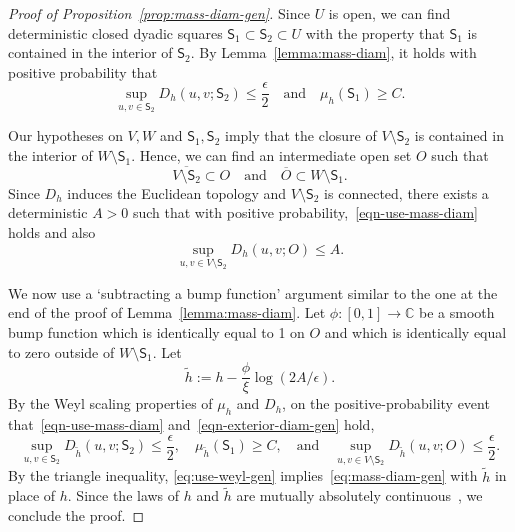 \documentclass[12pt]{amsart}
\numberwithin{equation}{section}
\begin{document}
	
	\begin{proof}[Proof of Proposition~\ref{prop:mass-diam-gen}]
		Since $U$ is open, we can find deterministic closed dyadic squares $\mathsf S_1 \subset \mathsf S_2 \subset U$ with the property that $\mathsf S_1$ is contained in the interior of $\mathsf S_2$. By Lemma~\ref{lemma:mass-diam}, it holds with positive probability that
		\begin{equation} \label{eqn-use-mass-diam}
		\sup_{u,v\in \mathsf S_2 } D_h\left( u , v ; \mathsf S_2 \right) \leq \frac{\epsilon}{2}  \quad \text{and} \quad \mu_h(\mathsf S_1) \geq C .
		\end{equation}
		
		Our hypotheses on $V,W$ and $\mathsf S_1,\mathsf S_2$ imply that the closure of $V\setminus \mathsf S_2$ is contained in the interior of $W\setminus \mathsf S_1$. Hence, we can find an intermediate open set $O$ such that 
		\begin{equation}
		\overline{V \setminus \mathsf S_2} \subset  O \quad \text{and} \quad \overline O \subset  W\setminus \mathsf S_1 .
		\end{equation}
		Since $D_h$ induces the Euclidean topology and $V\setminus \mathsf S_2$ is connected, there exists a deterministic $A > 0$ such that with positive probability,~\eqref{eqn-use-mass-diam} holds and also
		\begin{equation} \label{eqn-exterior-diam-gen}
		\sup_{u,v\in V\setminus \mathsf S_2} D_h(u,v; O) \leq A .
		\end{equation}
		
		We now use a `subtracting a bump function' argument similar to the one at the end of the proof of Lemma~\ref{lemma:mass-diam}. 
		Let $\phi : [0,1] \to \mathbb C$ be a smooth bump function which is identically equal to 1 on $O$ and which is identically equal to zero outside of $W\setminus \mathsf S_1$. 
		Let
		\begin{equation}
		\tilde h := h - \frac{\phi}{\xi} \log(2 A / \epsilon) .
		\end{equation}
		By the Weyl scaling properties of $\mu_h$ and $D_h$, on the positive-probability event that~\eqref{eqn-use-mass-diam} and~\eqref{eqn-exterior-diam-gen} hold,
		\begin{equation} \label{eq:use-weyl-gen}
		\sup_{u,v\in \mathsf S_2 } D_{\tilde h}\left( u , v ; \mathsf S_2 \right) \leq \frac{\epsilon}{2} ,
		\quad  \mu_{\tilde h}(\mathsf S_1) \geq C  ,   \quad \text{and} \quad
		\sup_{u,v\in V\setminus \mathsf S_2} D_{\tilde h}(u,v; O) \leq \frac{\epsilon}{2} .
		\end{equation}
		By the triangle inequality, \eqref{eq:use-weyl-gen} implies~\eqref{eq:mass-diam-gen} with $\tilde h$ in place of $h$. Since the laws of $h$ and $\tilde h$ are mutually absolutely continuous~\cite[Proposition 2.9]{miller2017imaginary}, we conclude the proof. 
	\end{proof}
	
\end{document}
